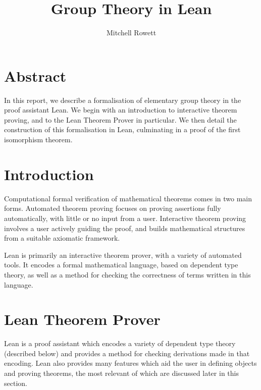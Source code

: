 \documentclass[runningheads,a4paper]{llncs}
\renewcommand{\-}{\setminus}
\begin{document}
\mainmatter 

\title{Group Theory in Lean}


\author{Mitchell Rowett}



\tocauthor{{}}

\maketitle

\medskip

\begingroup
\let\clearpage\relax
\tableofcontents
\endgroup

\section*{Abstract}

In this report, we describe a formalisation of elementary group theory in the proof assistant Lean. We begin with an introduction to interactive theorem proving, and to the Lean Theorem Prover in particular. We then detail the construction of this formalisation in Lean, culminating in a proof of the first isomorphism theorem.

\section{Introduction}

Computational formal verification of mathematical theorems comes in two main forms. Automated theorem proving focuses on proving assertions fully automatically, with little or no input from a user. Interactive theorem proving involves a user actively guiding the proof, and builds mathematical structures from a suitable axiomatic framework.

Lean is primarily an interactive theorem prover, with a variety of automated tools. It encodes a formal mathematical language, based on dependent type theory, as well as a method for checking the correctness of terms written in this language.

\section{Lean Theorem Prover}

Lean is a proof assistant which encodes a variety of dependent type theory (described below) and provides a method for checking derivations made in that encoding. Lean also provides many features which aid the user in defining objects and proving theorems, the most relevant of which are discussed later in this section.
\end{document}
